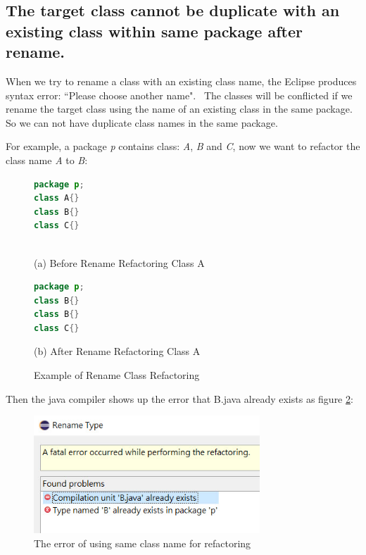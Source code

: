 \subsection{The target class cannot be duplicate with an existing class within same package after rename.}

When we try to rename a class with an existing class name, the Eclipse produces syntax error:
``Please choose another name".~\cite{EclipseWebPage} The classes will be conflicted if we rename the target class using the name of an existing class in the same package. So we can not have duplicate class names in the same package. 

For example, a package \textsl{p} contains class: \textsl{A}, \textsl{B} and \textsl{C}, now we want to refactor the class name \textsl{A} to \textsl{B}:

\begin{figure}[th]
\centering
\begin{minipage}[t]{0.6\linewidth}
\begin{lstlisting}[language=java, basicstyle=\scriptsize\ttfamily,frame=single]
package p;
class A{}	
class B{}
class C{}
 
\end{lstlisting}
\tiny{(a) Before Rename Refactoring Class A}
\end{minipage}
\hfill


\begin{minipage}[t]{0.6\linewidth}
\begin{lstlisting}[language=java, basicstyle=\scriptsize\ttfamily,frame=single]
package p;
class B{}	
class B{}
class C{}

\end{lstlisting}
\tiny{(b) After Rename Refactoring Class A}
\end{minipage}
\caption{Example of Rename Class Refactoring}
\label{fig:afterrr}
\end{figure}

Then the java compiler shows up the error that B.java already exists as figure \ref{fig:renameclassname}:

\begin{figure}[H]
\centerline{\includegraphics[width=85mm,scale=0.5]{SCN.jpg}}
\caption{The error of using same class name for refactoring}
\label{fig:renameclassname}
\end{figure}

